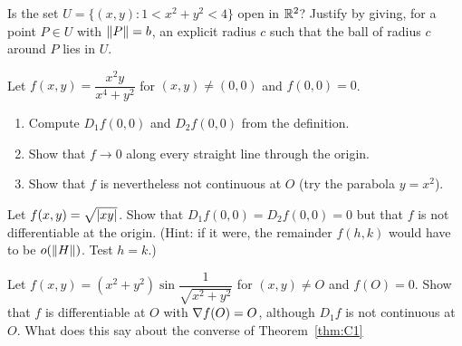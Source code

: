 \begin{exercise}[2]
Is the set $U=\{(x,y): 1<x^2+y^2<4\}$ open in $\mathbb{R}^2$? Justify by giving, for a point
$P\in U$ with $\left\lVert P\right\rVert=b$, an explicit radius $c$ such that the ball of radius $c$ around $P$
lies in $U$.
\end{exercise}

\begin{exercise}[2]
Let $f(x,y)=\dfrac{x^2y}{x^4+y^2}$ for $(x,y)\neq(0,0)$ and $f(0,0)=0$.
\begin{enumerate}[label=(\alph*)]
  \item Compute $D_1f(0,0)$ and $D_2f(0,0)$ from the definition.
  \item Show that $f\to0$ along every straight line through the origin.
  \item Show that $f$ is nevertheless not continuous at $O$ (try the parabola $y=x^2$).
\end{enumerate}
\end{exercise}

\begin{exercise}[3]
Let $f(x,y)=\sqrt{\left\lvert xy\right\rvert}$. Show that $D_1f(0,0)=D_2f(0,0)=0$ but that $f$ is not
differentiable at the origin. (Hint: if it were, the remainder $f(h,k)$ would have to be
$o(\left\lVert H\right\rVert)$. Test $h=k$.)
\end{exercise}

\begin{exercise}[3]
Let $f(x,y)=(x^2+y^2)\sin\!\dfrac{1}{\sqrt{x^2+y^2}}$ for $(x,y)\neq O$ and $f(O)=0$.
Show that $f$ is differentiable at $O$ with $\nabla f(O)=O$, although $D_1f$ is not
continuous at $O$. What does this say about the converse of Theorem~\ref{thm:C1}
\end{exercise}
